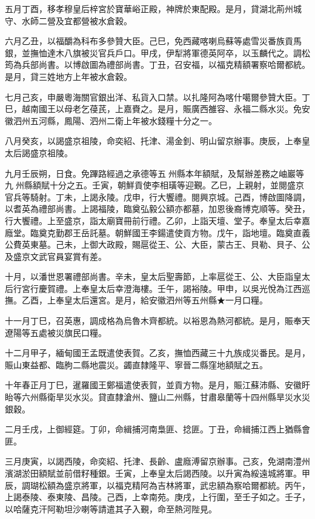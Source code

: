 \begin{pinyinscope}
五月丁酉，移孝穆皇后梓宮於寶華峪正殿，神牌於東配殿。是月，貸湖北荊州城守、水師二營及宜都營被水倉穀。

六月乙丑，以福釂為科布多參贊大臣。己巳，免西藏喀喇烏蘇等處雪災番族貢馬銀，並撫恤達木八旗被災官兵戶口。甲戌，伊犁將軍德英阿卒，以玉麟代之。調松筠為兵部尚書。以博啟圖為禮部尚書。丁丑，召安福，以福克精額署察哈爾都統。是月，貸三姓地方上年被水倉穀。

七月己亥，申嚴粵海關官銀出洋、私貨入口禁。以扎隆阿為喀什噶爾參贊大臣。丁巳，越南國王以母老乞葠芪，上嘉賚之。是月，賑廣西雒容、永福二縣水災。免安徽泗州五河縣，鳳陽、泗州二衛上年被水錢糧十分之一。

八月癸亥，以謁盛京祖陵，命奕紹、托津、湯金釗、明山留京辦事。庚辰，上奉皇太后謁盛京祖陵。

九月壬辰朔，日食。免蹕路經過之承德等五州縣本年額賦，及幫辦差務之岫巖等九州縣額賦十分之五。壬寅，朝鮮貢使李相璜等迎覲。乙巳，上親射，並閱盛京官兵等騎射。丁未，上謁永陵。戊申，行大饗禮。閱興京城。己酉，博啟圖降調，以耆英為禮部尚書。上謁福陵，臨奠弘毅公額亦都墓，加恩後裔博克順等。癸丑，行大饗禮。上至盛京，詣太廟寶冊前行禮。乙卯，上詣天壇、堂子。奉皇太后幸嘉廕堂。臨奠克勤郡王岳託墓。朝鮮國王李鍚遣使貢方物。戊午，詣地壇。臨奠直義公費英東墓。己未，上御大政殿，賜扈從王、公、大臣，蒙古王、貝勒、貝子、公及盛京文武官員宴賞有差。

十月，以潘世恩署禮部尚書。辛未，皇太后聖壽節，上率扈從王、公、大臣詣皇太后行宮行慶賀禮。上奉皇太后幸澄海樓。壬午，謁裕陵。甲申，以吳光悅為江西巡撫。乙酉，上奉皇太后還宮。是月，給安徽泗州等五州縣★一月口糧。

十一月丁巳，召英惠，調成格為烏魯木齊都統。以裕恩為熱河都統。是月，賑奉天遼陽等五處被災旗民口糧。

十二月甲子，緬甸國王孟既遣使表賀。乙亥，撫恤西藏三十九族成災番民。是月，賑山東益都、臨朐二縣地震災。蠲直隸隆平、寧晉二縣窪地額賦之五。

十年春正月丁巳，暹羅國王鄭福遣使表賀，並貢方物。是月，賑江蘇沛縣、安徽盱眙等六州縣衛旱災水災。貸直隸滄州、鹽山二州縣，甘肅皋蘭等十四州縣旱災水災銀穀。

二月壬戌，上御經筵。丁卯，命緝捕河南梟匪、捻匪。丁丑，命緝捕江西上猶縣會匪。

三月庚寅，以謁西陵，命奕紹、托津、長齡、盧廕溥留京辦事。己亥，免湖南澧州濱湖淤田額賦並前借籽種銀。壬寅，上奉皇太后謁西陵。以升寅為綏遠城將軍。甲辰，調瑚松額為盛京將軍，以福克精阿為吉林將軍，武忠額為察哈爾都統。丙午，上謁泰陵、泰東陵、昌陵。己酉，上幸南苑。庚戌，上行圍，至壬子如之。壬子，以哈薩克汗阿勒坦沙喇等請遣其子入覲，命至熱河陛見。


\end{pinyinscope}
